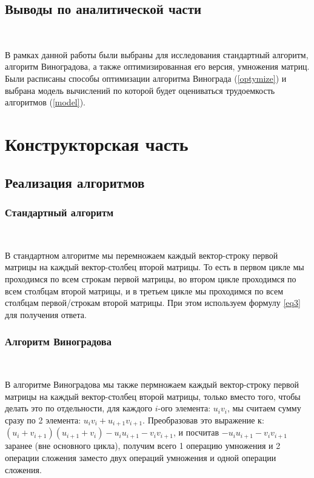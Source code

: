 \documentclass[12pt]{report}
\begin{document}
	\section{Выводы по аналитической части}
	
	~\
	
	В рамках данной работы были выбраны для исследования стандартный алгоритм, алгоритм Виноградова, а также оптимизированная его версия, умножения матриц.
	Были расписаны способы оптимизации алгоритма Винограда (\ref{optymize}) и выбрана модель вычислений по которой будет оцениваться трудоемкость алгоритмов (\ref{model}).
		
	\chapter{Конструкторская часть}
	
	\section{Реализация алгоритмов}
	
	\subsection{Стандартный алгоритм}
	
	~\
	
	В стандартном алгоритме мы перемножаем каждый вектор-строку первой матрицы на каждый вектор-столбец второй матрицы. То есть в первом цикле мы проходимся по всем строкам первой матрицы, во втором цикле проходимся по всем столбцам второй матрицы, и в третьем цикле мы проходимся по всем столбцам первой/строкам второй матрицы. При этом используем формулу \ref{eq3} для получения ответа.
	
	\subsection{Алгоритм Виноградова}
	
	~\
	
	В алгоритме Виноградова мы также пермножаем каждый вектор-строку первой матрицы на каждый вектор-столбец второй матрицы, только вместо того, чтобы делать это по отдельности, для каждого $i$-ого элемента: $u_{i}v_{i}$, мы считаем сумму сразу по 2 элемента: $u_{i}v_{i} + u_{i + 1}v_{i + 1}$. Преобразовав это выражение к: $(u_{i} + v_{i + 1})(u_{i + 1} + v_{i}) - u_{i}u_{i + 1} - v_{i}v_{i + 1}$, и посчитав $- u_{i}u_{i + 1} - v_{i}v_{i + 1}$ заранее (вне основного цикла), получим всего 1 операцию умножения и 2 операции сложения заместо двух операций умножения и одной операции сложения.
	
\end{document}
